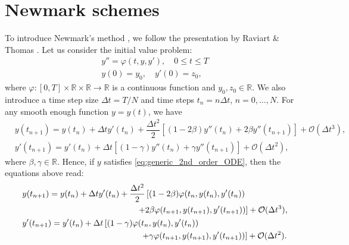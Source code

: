 \documentclass{sfuthesis}
\numberwithin{equation}{section}
\numberwithin{figure}{chapter}
\numberwithin{table}{chapter}
\theoremstyle{definition}
\newcommand{\R}{\mathbb{R}}
\begin{document}
\section{Newmark schemes} \label{sec:newmark_schemes}

To introduce Newmark's method \cite{Newmark}, we follow the presentation by Raviart \& Thomas \cite{raviartthomas}. Let us consider the initial value problem:
\begin{subequations} \label{eq:generic_2nd_order_ODE}
\begin{gather}
    y'' = \varphi(t,y,y'), \quad 0 \leq t \leq T \\
    y(0) = y_0, \quad y'(0) = z_0,
\end{gather}
\end{subequations}
where $\varphi:[0,T] \times \R \times \R \to \R$ is a continuous function and $y_0,z_0 \in \R$. We also introduce a time step size $\Delta t = T/N$ and time steps $t_n = n \Delta t$, $n=0,\dots,N$. For any smooth enough function $y = y(t)$, we have
\begin{subequations}
    \begin{align}
        &y(t_{n+1}) = y(t_n) + \Delta t y'(t_n) + \dfrac{\Delta t^2}{2} \left[ (1-2\beta)y''(t_n) + 2\beta y''(t_{n+1}) \right] + \mathcal{O}(\Delta t^3), \\
        &y'(t_{n+1}) = y'(t_n) + \Delta t \left[(1-\gamma)y''(t_n) + \gamma y''(t_{n+1}) \right] + \mathcal{O}(\Delta t^2),
    \end{align}
\end{subequations}
where $\beta,\gamma \in \R$. Hence, if $y$ satisfies \eqref{eq:generic_2nd_order_ODE}, then the equations above read:
\begin{subequations}
    \begin{align}
        &\begin{multlined}
            y(t_{n+1}) = y(t_n) + \Delta t y'(t_n) + \dfrac{\Delta t^2}{2} \left[ (1-2\beta) \varphi(t_n, y(t_n), y'(t_n)) \right. \qquad \qquad \\
            \left. + 2\beta \varphi(t_{n+1}, y(t_{n+1}), y'(t_{n+1})) \right] + \mathcal{O}(\Delta t^3), 
        \end{multlined}
         \\
        &\begin{multlined}
            y'(t_{n+1}) = y'(t_n) + \Delta t \left[(1-\gamma)\varphi(t_n, y(t_n), y'(t_n)) \right. \hspace*{9.5em}\\
            \left. + \gamma  \varphi(t_{n+1}, y(t_{n+1}), y'(t_{n+1})) \right] + \mathcal{O}(\Delta t^2). 
        \end{multlined}
    \end{align}
\end{subequations}
\end{document}
